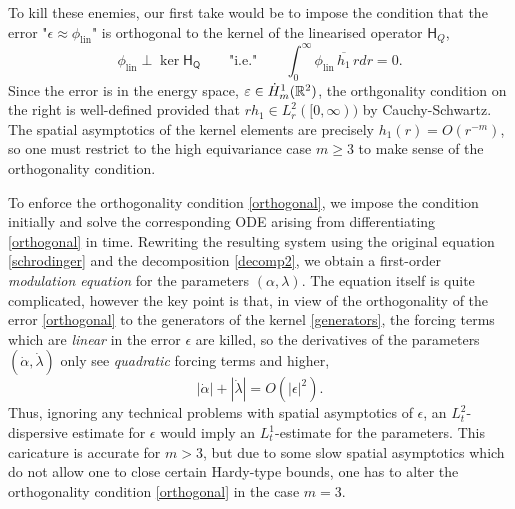 To kill these enemies, our first take would be to impose the condition that the error "$\epsilon \approx \phi_{\mathrm{lin}}$" is orthogonal to the kernel of the linearised operator $\mathsf H_Q$, 
	\begin{equation}\label{eq:orthogonal}
		\phi_{\mathrm{lin}} \perp \ker \mathsf{H_Q} \qquad \text{"i.e."} \qquad \int_0^\infty \phi_{\mathrm{lin}} \, \overline{h_1} \, r dr 
			= 0. 
	\end{equation}
Since the error is in the energy space, $\varepsilon \in \dot H^1_m (\mathbb R^2)$, the orthgonality condition on the right is well-defined provided that $rh_1 \in L^2_r ([0, \infty))$ by Cauchy-Schwartz. The spatial asymptotics of the kernel elements are precisely $h_1 (r) = O(r^{-m})$, so one must restrict to the high equivariance case $m \geq 3$ to make sense of the orthogonality condition. 

To enforce the orthogonality condition \eqref{orthogonal}, we impose the condition initially and solve the corresponding ODE arising from differentiating \eqref{orthogonal} in time. Rewriting the resulting system using the original equation \eqref{schrodinger} and the decomposition \eqref{decomp2}, we obtain a first-order \textit{modulation equation} for the parameters $(\alpha, \lambda)$. The equation itself is quite complicated, however the key point is that, in view of the orthogonality of the error \eqref{orthogonal} to the generators of the kernel \eqref{generators}, the forcing terms which are \textit{linear} in the error $\epsilon$ are killed, so
the derivatives of the parameters $(\dot{\alpha}, \dot{\lambda})$ only see \textit{quadratic} forcing terms and higher,
	\begin{equation}\label{eq:quadratic}
		|\dot \alpha| + |\dot{\lambda}| 
			= O(|\epsilon|^2). 
	\end{equation}
Thus, ignoring any technical problems with spatial asymptotics of $\epsilon$, an $L^2_t$-dispersive estimate for $\epsilon$ would imply an $L^1_t$-estimate for the parameters. This caricature is accurate for $m > 3$, but due to some slow spatial asymptotics which do not allow one to close certain Hardy-type bounds, one has to alter the orthogonality condition \eqref{orthogonal} in the case $m = 3$. 

